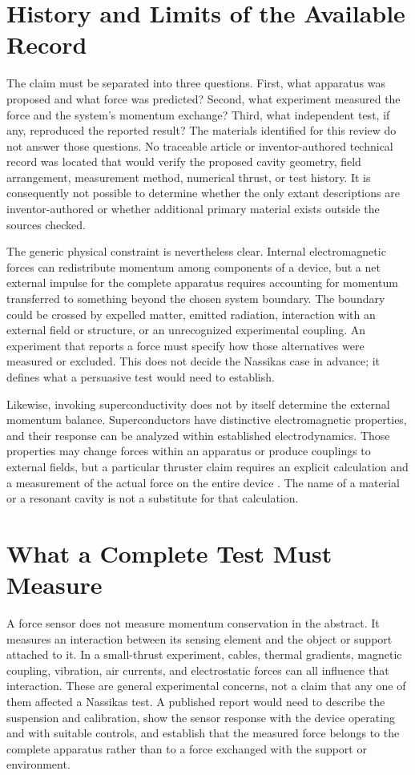 \documentclass[11pt]{article}
\begin{document}
\section{History and Limits of the Available Record}

The claim must be separated into three questions. First, what apparatus was proposed and what force was predicted? Second, what experiment measured the force and the system's momentum exchange? Third, what independent test, if any, reproduced the reported result? The materials identified for this review do not answer those questions. No traceable article or inventor-authored technical record was located that would verify the proposed cavity geometry, field arrangement, measurement method, numerical thrust, or test history. It is consequently not possible to determine whether the only extant descriptions are inventor-authored or whether additional primary material exists outside the sources checked.

The generic physical constraint is nevertheless clear. Internal electromagnetic forces can redistribute momentum among components of a device, but a net external impulse for the complete apparatus requires accounting for momentum transferred to something beyond the chosen system boundary. The boundary could be crossed by expelled matter, emitted radiation, interaction with an external field or structure, or an unrecognized experimental coupling. An experiment that reports a force must specify how those alternatives were measured or excluded. This does not decide the Nassikas case in advance; it defines what a persuasive test would need to establish.

Likewise, invoking superconductivity does not by itself determine the external momentum balance. Superconductors have distinctive electromagnetic properties, and their response can be analyzed within established electrodynamics. Those properties may change forces within an apparatus or produce couplings to external fields, but a particular thruster claim requires an explicit calculation and a measurement of the actual force on the entire device \cite{Jackson1999}. The name of a material or a resonant cavity is not a substitute for that calculation.

\section{What a Complete Test Must Measure}

A force sensor does not measure momentum conservation in the abstract. It measures an interaction between its sensing element and the object or support attached to it. In a small-thrust experiment, cables, thermal gradients, magnetic coupling, vibration, air currents, and electrostatic forces can all influence that interaction. These are general experimental concerns, not a claim that any one of them affected a Nassikas test. A published report would need to describe the suspension and calibration, show the sensor response with the device operating and with suitable controls, and establish that the measured force belongs to the complete apparatus rather than to a force exchanged with the support or environment.
\end{document}
